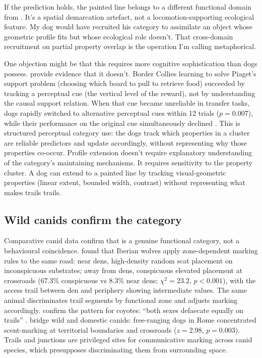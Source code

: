 \documentclass[12pt]{article}
\begin{document}
If the prediction holds, the painted line belongs to a different functional domain from . It's a spatial demarcation artefact, not a locomotion-supporting ecological feature. My dog would have recruited his  category to assimilate an object whose geometric profile fits but whose ecological role doesn't. That cross-domain recruitment on partial property overlap is the operation I'm calling metaphorical.

One objection might be that this requires more cognitive sophistication than dogs possess. \textcite{muller2014} provide evidence that it doesn't. Border Collies learning to solve Piaget's support problem (choosing which board to pull to retrieve food) succeeded by tracking a perceptual cue (the vertical level of the reward), not by understanding the causal support relation. When that cue became unreliable in transfer tasks, dogs rapidly switched to alternative perceptual cues within 12 trials ($p = 0.007$), while their performance on the original cue simultaneously declined \citep[1077]{muller2014}. This is structured perceptual category use: the dogs track which properties in a cluster are reliable predictors and update accordingly, without representing why those properties co-occur. Profile extension doesn't require explanatory understanding of the category's maintaining mechanisms. It requires sensitivity to the property cluster. A dog can extend  to a painted line by tracking visual-geometric properties (linear extent, bounded width, contrast) without representing what makes trails trails.

\subsection{Wild canids confirm the category}

Comparative canid data confirm that  is a genuine functional category, not a behavioural coincidence. \textcite{barja2005} found that Iberian wolves apply zone-dependent marking rules to the same road: near dens, high-density random scat placement on inconspicuous substrates; away from dens, conspicuous elevated placement at crossroads (67.3\% conspicuous vs 8.3\% near dens; $\chi^2 = 23.2$, $p < 0.001$), with the access trail between den and periphery showing intermediate values. The same animal discriminates trail segments by functional zone and adjusts marking accordingly. \textcite{kohn1999} confirm the pattern for coyotes: \enquote{both sexes defaecate equally on trails} \citep[660]{kohn1999}. \textcite{cafazzo2012} bridge wild and domestic canids: free-ranging dogs in Rome concentrated scent-marking at territorial boundaries and crossroads ($z = 2.98$, $p = 0.003$). Trails and junctions are privileged sites for communicative marking across canid species, which presupposes discriminating them from surrounding space.
\end{document}
